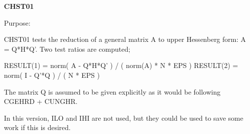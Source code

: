 {\bfseries C\+H\+S\+T01} 

\begin{DoxyParagraph}{Purpose\+: }
\begin{DoxyVerb} CHST01 tests the reduction of a general matrix A to upper Hessenberg
 form:  A = Q*H*Q'.  Two test ratios are computed;

 RESULT(1) = norm( A - Q*H*Q' ) / ( norm(A) * N * EPS )
 RESULT(2) = norm( I - Q'*Q ) / ( N * EPS )

 The matrix Q is assumed to be given explicitly as it would be
 following CGEHRD + CUNGHR.

 In this version, ILO and IHI are not used, but they could be used
 to save some work if this is desired.\end{DoxyVerb}
 
\end{DoxyParagraph}

